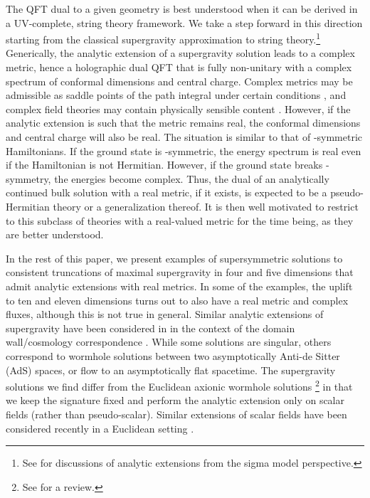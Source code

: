 The QFT dual to a given geometry is best understood when it can be derived in a UV-complete, string theory framework.
We take a step forward in this direction starting from the classical supergravity approximation to string theory.\footnote{See \eg \cite{Nekrasov:2023xzm,Zigdon:2026xal} for discussions of analytic extensions from the sigma model perspective.}
Generically, the analytic extension of a supergravity solution leads to a complex metric, hence a holographic dual QFT that is fully non-unitary with a complex spectrum of conformal dimensions and central charge.
Complex metrics may be admissible as saddle points of the path integral under certain conditions 
\cite{Kontsevich:2021dmb,Witten:2021nzp,Lehners:2021mah,Krishna:2026rma}, and complex field theories may contain physically sensible content \cite{Gorbenko:2018dtm,Gorbenko:2018ncu}.
However, if the analytic extension is such that the metric remains real, the 
conformal dimensions and central charge will also be real.
The situation is similar to that of \PT-symmetric Hamiltonians.
If the ground state is \PT-symmetric, the energy spectrum is real even if the Hamiltonian is not Hermitian.
However, if the ground state breaks \PT-symmetry, the energies become complex.
Thus, the dual of an analytically continued bulk solution with a real metric, if it exists, is expected to be a pseudo-Hermitian theory or a generalization thereof.
It is then well motivated to restrict to this subclass of theories with a real-valued metric for the time being, as they are better understood.

In the rest of this paper, we present examples of supersymmetric solutions to consistent truncations of maximal supergravity in four and five dimensions that admit analytic extensions with real metrics.
In some of the examples, the uplift to ten and eleven dimensions turns out to also have a real metric and complex fluxes, although this is not true in general.
Similar analytic extensions of supergravity have been considered in \cite{Bergshoeff:2007cg,Skenderis:2007sm} in the context of the domain wall/cosmology correspondence \cite{Skenderis:2006jq}.
While some solutions are singular, others correspond to wormhole solutions between two asymptotically Anti-de Sitter (AdS) spaces, or flow to an asymptotically flat spacetime.
The supergravity solutions we find differ from the Euclidean axionic wormhole solutions \cite{Giddings:1987cg,Gutperle:2002km,Bergshoeff:2004pg,Bergshoeff:2005zf,Arkani-Hamed:2007cpn,Bergshoeff:2008be,Hertog:2017owm,Ruggeri:2017grz,Marolf:2021kjc,Astesiano:2022qba,Loges:2023ypl,Astesiano:2023iql,Anabalon:2023kcp,DiUbaldo:2026rly}\footnote{See \cite{Hebecker:2018ofv} for a review.} in that we keep the signature fixed and perform the analytic extension only on scalar fields (rather than pseudo-scalar).
Similar extensions of scalar fields have been considered recently in a Euclidean setting \cite{Maldacena:2026jqd}.

